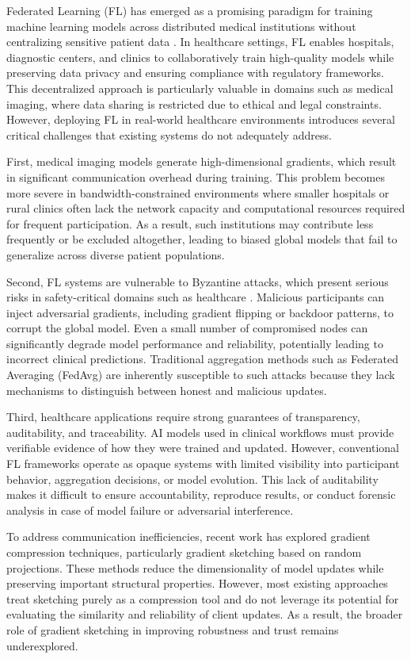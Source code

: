 \documentclass[conference]{IEEEtran}
\begin{document}
Federated Learning (FL) has emerged as a promising paradigm for training machine learning models across distributed medical institutions without centralizing sensitive patient data \cite{blockdfl}. In healthcare settings, FL enables hospitals, diagnostic centers, and clinics to collaboratively train high-quality models while preserving data privacy and ensuring compliance with regulatory frameworks. This decentralized approach is particularly valuable in domains such as medical imaging, where data sharing is restricted due to ethical and legal constraints. However, deploying FL in real-world healthcare environments introduces several critical challenges that existing systems do not adequately address.

First, medical imaging models generate high-dimensional gradients, which result in significant communication overhead during training. This problem becomes more severe in bandwidth-constrained environments where smaller hospitals or rural clinics often lack the network capacity and computational resources required for frequent participation. As a result, such institutions may contribute less frequently or be excluded altogether, leading to biased global models that fail to generalize across diverse patient populations.

Second, FL systems are vulnerable to Byzantine attacks, which present serious risks in safety-critical domains such as healthcare \cite{bema}. Malicious participants can inject adversarial gradients, including gradient flipping or backdoor patterns, to corrupt the global model. Even a small number of compromised nodes can significantly degrade model performance and reliability, potentially leading to incorrect clinical predictions. Traditional aggregation methods such as Federated Averaging (FedAvg) are inherently susceptible to such attacks because they lack mechanisms to distinguish between honest and malicious updates.

Third, healthcare applications require strong guarantees of transparency, auditability, and traceability. AI models used in clinical workflows must provide verifiable evidence of how they were trained and updated. However, conventional FL frameworks operate as opaque systems with limited visibility into participant behavior, aggregation decisions, or model evolution. This lack of auditability makes it difficult to ensure accountability, reproduce results, or conduct forensic analysis in case of model failure or adversarial interference.

To address communication inefficiencies, recent work has explored gradient compression techniques, particularly gradient sketching based on random projections. These methods reduce the dimensionality of model updates while preserving important structural properties. However, most existing approaches treat sketching purely as a compression tool and do not leverage its potential for evaluating the similarity and reliability of client updates. As a result, the broader role of gradient sketching in improving robustness and trust remains underexplored.
\end{document}
